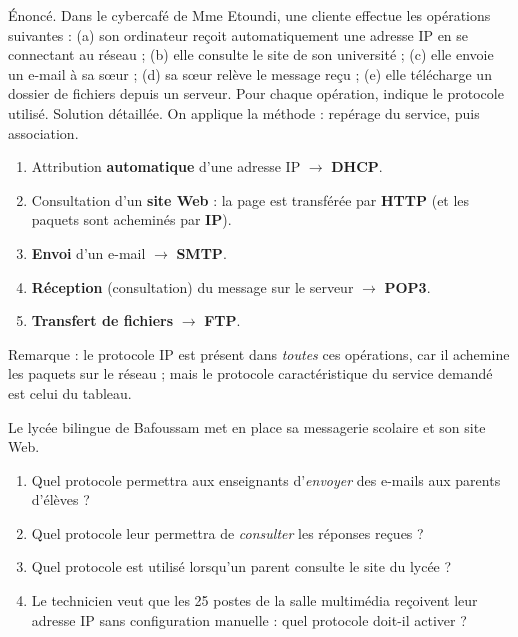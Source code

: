 \documentclass[11pt]{article}
\begin{document}
\begin{exoresolu}
Énoncé. Dans le cybercafé de Mme Etoundi, une cliente effectue les opérations suivantes : (a) son ordinateur reçoit automatiquement une adresse IP en se connectant au réseau ; (b) elle consulte le site de son université ; (c) elle envoie un e-mail à sa sœur ; (d) sa sœur relève le message reçu ; (e) elle télécharge un dossier de fichiers depuis un serveur. Pour chaque opération, indique le protocole utilisé.
\tcblower
Solution détaillée. On applique la méthode : repérage du service, puis association.
\begin{enumerate}
\item[(a)] Attribution \textbf{automatique} d'une adresse IP $\to$ \textbf{DHCP}.
\item[(b)] Consultation d'un \textbf{site Web} : la page est transférée par \textbf{HTTP} (et les paquets sont acheminés par \textbf{IP}).
\item[(c)] \textbf{Envoi} d'un e-mail $\to$ \textbf{SMTP}.
\item[(d)] \textbf{Réception} (consultation) du message sur le serveur $\to$ \textbf{POP3}.
\item[(e)] \textbf{Transfert de fichiers} $\to$ \textbf{FTP}.
\end{enumerate}
Remarque : le protocole IP est présent dans \emph{toutes} ces opérations, car il achemine les paquets sur le réseau ; mais le protocole caractéristique du service demandé est celui du tableau.
\end{exoresolu}

\begin{exercice}
Le lycée bilingue de Bafoussam met en place sa messagerie scolaire et son site Web.
\begin{enumerate}
\item Quel protocole permettra aux enseignants d'\emph{envoyer} des e-mails aux parents d'élèves ?
\item Quel protocole leur permettra de \emph{consulter} les réponses reçues ?
\item Quel protocole est utilisé lorsqu'un parent consulte le site du lycée ?
\item Le technicien veut que les 25 postes de la salle multimédia reçoivent leur adresse IP sans configuration manuelle : quel protocole doit-il activer ?
\end{enumerate}
\end{exercice}
\end{document}

